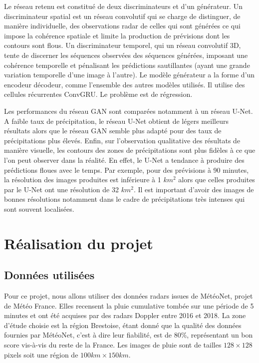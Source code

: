 \documentclass[12pt,a4paper,french]{article}
\newcommand\secspacing{1.5cm}
\newcommand\subsecspacing{1cm}
\begin{document}
Le réseau retenu est constitué de deux discriminateurs et d'un générateur. Un discriminateur spatial est un réseau convolutif qui se charge de distinguer, de manière individuelle, des observations radar de celles qui sont générées ce qui impose la cohérence spatiale et limite la production de prévisions dont les contours sont flous. Un discriminateur temporel, qui un réseau convolutif 3D, tente de discerner les séquences observées des séquences générées, imposant une cohérence temporelle et pénalisant les prédictions sautillantes (ayant une grande variation temporelle d'une image à l'autre). Le modèle générateur a la forme d'un encodeur décodeur, comme l'ensemble des autres modèles utilisés. Il utilise des cellules récurrentes ConvGRU. Le problème est de régression. \newline

Les performances du réseau GAN sont comparées notamment à un réseau U-Net. A faible taux de précipitation, le réseau U-Net obtient de légers meilleurs résultats alors que le réseau GAN semble plus adapté pour des taux de précipitations plus élevés. Enfin, sur l'observation qualitative des résultats de manière visuelle, les contours des zones de précipitations sont plus fidèles à ce que l'on peut observer dans la réalité. En effet, le U-Net a tendance à produire des prédictions floues avec le temps. Par exemple, pour des prévisions à 90 minutes, la résolution des images produites est inférieure à 1 $ km^2 $ alors que celles produites par le U-Net ont une résolution de 32 $ km^2 $. Il est important d'avoir des images de bonnes résolutions notamment dans le cadre de précipitations très intenses qui sont souvent localisées. \newline

\vspace{\secspacing}

\section{Réalisation du projet}

\vspace{\subsecspacing}

\subsection{Données utilisées}

Pour ce projet, nous allons utiliser des données radars issues de MétéoNet, projet de Météo France. Elles recensent la pluie cumulative tombée sur une période de 5 minutes et ont été acquises par des radars Doppler entre 2016 et 2018. La zone d'étude choisie est la région Brestoise, étant donné que la qualité des données fournies par MétéoNet, c'est à dire leur fiabilité, est de 80\%, représentant un bon score vis-à-vis du reste de la France. Les images de pluie sont de tailles $ 128 \times 128 $  pixels soit une région de $ 100 km \times 150 km $. \newline
\end{document}
